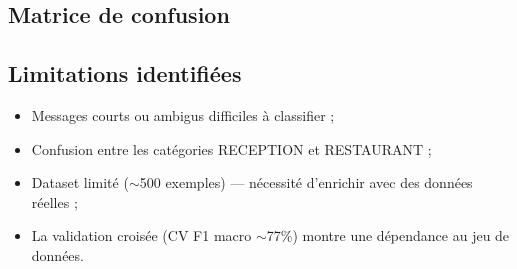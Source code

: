 \subsection*{Matrice de confusion}


\subsection*{Limitations identifiées}

\begin{itemize}
  \item Messages courts ou ambigus difficiles à classifier ;
  \item Confusion entre les catégories RECEPTION et RESTAURANT ;
  \item Dataset limité ($\sim$500 exemples) — nécessité d'enrichir avec des données réelles ;
  \item La validation croisée (CV F1 macro $\sim$77\%) montre une dépendance au jeu de données.
\end{itemize}
